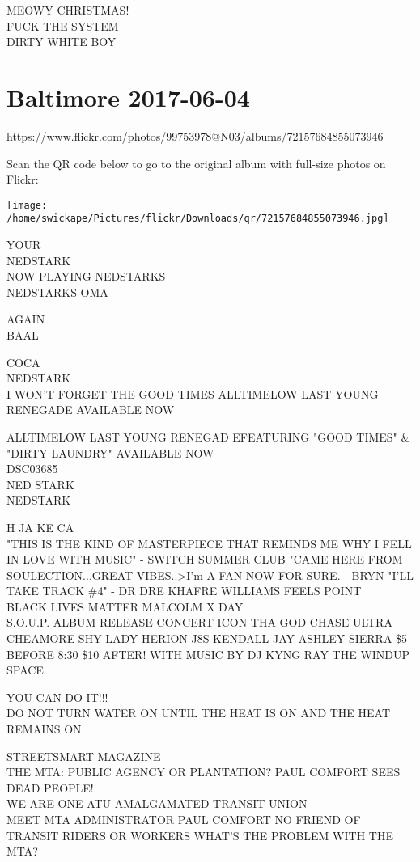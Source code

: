 \documentclass[10pt,letterpaper]{article}
\begin{document}
MEOWY CHRISTMAS!\\
FUCK THE SYSTEM\\
DIRTY WHITE BOY


\section*{Baltimore 2017-06-04}

\url{https://www.flickr.com/photos/99753978@N03/albums/72157684855073946}

Scan the QR code below to go to the original album with full-size photos on Flickr:

\texttt{[image: /home/swickape/Pictures/flickr/Downloads/qr/72157684855073946.jpg]}


YOUR\\
NEDSTARK\\
NOW PLAYING NEDSTARKS\\
NEDSTARKS OMA

AGAIN\\
BAAL

COCA\\
NEDSTARK\\
I WON'T FORGET THE GOOD TIMES ALLTIMELOW LAST YOUNG RENEGADE AVAILABLE NOW

ALLTIMELOW LAST YOUNG RENEGAD EFEATURING "GOOD TIMES" \& "DIRTY LAUNDRY" AVAILABLE NOW\\
DSC03685\\
NED STARK\\
NEDSTARK

H JA KE CA\\
"THIS IS THE KIND OF MASTERPIECE THAT REMINDS ME WHY I FELL IN LOVE WITH MUSIC" {-} SWITCH SUMMER CLUB "CAME HERE FROM SOULECTION...GREAT VIBES..>I'm A FAN NOW FOR SURE.  {-} BRYN "I'LL TAKE TRACK \#4" {-} DR DRE KHAFRE WILLIAMS FEELS POINT\\
BLACK LIVES MATTER MALCOLM X DAY\\
S.O.U.P. ALBUM RELEASE CONCERT ICON THA GOD CHASE ULTRA CHEAMORE SHY LADY HERION J8S KENDALL JAY ASHLEY SIERRA \$5 BEFORE 8:30 \$10 AFTER!  WITH MUSIC BY DJ KYNG RAY THE WINDUP SPACE

YOU CAN DO IT!!!\\
DO NOT TURN WATER ON UNTIL THE HEAT IS ON AND THE HEAT REMAINS ON

STREETSMART MAGAZINE\\
THE MTA: PUBLIC AGENCY OR PLANTATION?  PAUL COMFORT SEES DEAD PEOPLE!\\
WE ARE ONE ATU AMALGAMATED TRANSIT UNION\\
MEET MTA ADMINISTRATOR PAUL COMFORT NO FRIEND OF TRANSIT RIDERS OR WORKERS WHAT'S THE PROBLEM WITH THE MTA?
\end{document}
